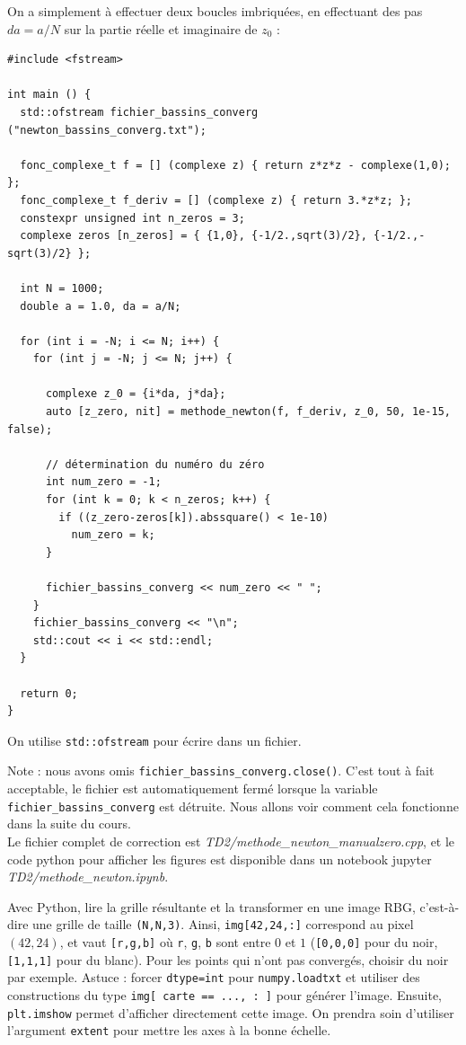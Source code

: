 \documentclass{book}
\newcommand{\inline}[1]{\texttt{#1}}
\def\filename{\emph}
\begin{document}
\begin{correction}
On a simplement à effectuer deux boucles imbriquées, en effectuant des pas $da=a/N$ sur la partie réelle et imaginaire de $z_0$ :
\begin{verbatim}
#include <fstream>

int main () {
  std::ofstream fichier_bassins_converg ("newton_bassins_converg.txt");

  fonc_complexe_t f = [] (complexe z) { return z*z*z - complexe(1,0); };
  fonc_complexe_t f_deriv = [] (complexe z) { return 3.*z*z; };
  constexpr unsigned int n_zeros = 3;
  complexe zeros [n_zeros] = { {1,0}, {-1/2.,sqrt(3)/2}, {-1/2.,-sqrt(3)/2} };

  int N = 1000;
  double a = 1.0, da = a/N;

  for (int i = -N; i <= N; i++) {
    for (int j = -N; j <= N; j++) {

      complexe z_0 = {i*da, j*da};
      auto [z_zero, nit] = methode_newton(f, f_deriv, z_0, 50, 1e-15, false);

      // détermination du numéro du zéro
      int num_zero = -1;
      for (int k = 0; k < n_zeros; k++) {
        if ((z_zero-zeros[k]).abssquare() < 1e-10)
          num_zero = k;
      }

      fichier_bassins_converg << num_zero << " ";
    }
    fichier_bassins_converg << "\n";
    std::cout << i << std::endl;
  }

  return 0;
}
\end{verbatim}

On utilise \inline{std::ofstream} pour écrire dans un fichier.

Note : nous avons omis \inline{fichier_bassins_converg.close()}. C'est tout à fait acceptable, le fichier est automatiquement fermé lorsque la variable \inline{fichier_bassins_converg} est détruite. Nous allons voir comment cela fonctionne dans la suite du cours.\\

Le fichier complet de correction est \filename{TD2/methode\_newton\_manualzero.cpp}, et le code python pour afficher les figures est disponible dans un notebook jupyter \filename{TD2/methode\_newton.ipynb}.

\end{correction}

Avec Python, lire la grille résultante et la transformer en une image RBG, c'est-à-dire une grille de taille \inline{(N,N,3)}. Ainsi, \inline{img[42,24,:]} correspond au pixel $(42,24)$, et vaut \inline{[r,g,b]} où \texttt{r}, \texttt{g}, \texttt{b} sont entre $0$ et $1$ (\inline{[0,0,0]} pour du noir, \inline{[1,1,1]} pour du blanc). Pour les points qui n'ont pas convergés, choisir du noir par exemple. Astuce : forcer \texttt{dtype=int} pour \texttt{numpy.loadtxt} et utiliser des constructions du type \inline{img[ carte == ..., : ]} pour générer l'image. Ensuite, \inline{plt.imshow} permet d'afficher directement cette image. On prendra soin d'utiliser l'argument \texttt{extent} pour mettre les axes à la bonne échelle.\\
\end{document}
